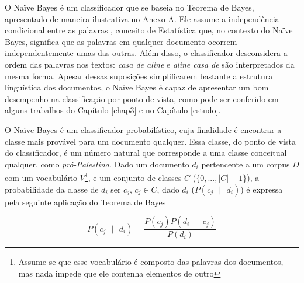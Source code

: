 

O Naïve Bayes é um classificador que se baseia no Teorema de Bayes, apresentado de maneira ilustrativa no Anexo A. Ele assume a independência condicional entre as palavras \cite{naive-forty}, conceito de Estatística que, no contexto do Naïve Bayes, significa que as palavras em qualquer documento ocorrem independentemente umas das outras. Além disso, o classificador desconsidera a ordem das palavras nos textos: \emph{casa de aline} e \emph{aline casa de} são interpretados da mesma forma. Apesar dessas suposições simplificarem bastante a estrutura linguística dos documentos, o Naïve Bayes é capaz de apresentar um bom desempenho na classificação por ponto de vista, como pode ser conferido em alguns trabalhos do Capítulo \ref{chap3} e no Capítulo \ref{estudo}.%


O Naïve Bayes é um classificador probabilístico, cuja finalidade é encontrar a classe mais provável para um documento qualquer. Essa classe, do ponto de vista do classificador, é um número natural que corresponde a uma classe conceitual qualquer, como \emph{pró-Palestina}. Dado um documento \ensuremath{d_i} pertencente a um corpus \ensuremath{D} com um vocabulário \ensuremath{V}\footnote{Assume-se que esse vocabulário é composto das palavras dos documentos, mas nada impede que ele contenha elementos de outro }, e um conjunto de classes \ensuremath{C} (\ensuremath{\{0, ..., |C| - 1\}}), a probabilidade da classe de \ensuremath{d_i} ser \ensuremath{c_j}, \ensuremath{c_j \in C}, dado \ensuremath{d_i} (\ensuremath{P(c_j\mbox{ }|\mbox{ }d_i)}) é expressa pela seguinte  aplicação do Teorema de Bayes \cite{naive-forty}

\begin{equation}
\label{teorema-bayes}
\ensuremath{P(c_j\mbox{ }|\mbox{ }d_i) = \frac{P(c_j)P(d_i\mbox{ }|\mbox{ }c_j)}{P(d_i)}}
\end{equation}

